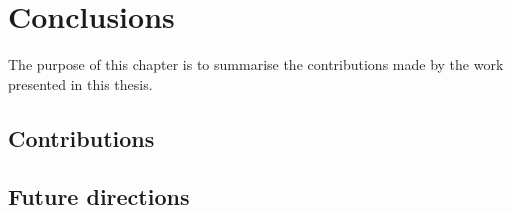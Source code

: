 \chapter{Conclusions}
\label{chap:conclusion}

\chaptertoc{}

\begin{chapterabstract}
The purpose of this chapter is to summarise the contributions made by the work presented in this thesis.
\end{chapterabstract}


\section{Contributions}
\label{sec:conc_contributions}
\blindtext



\section{Future directions}
\blindtext


